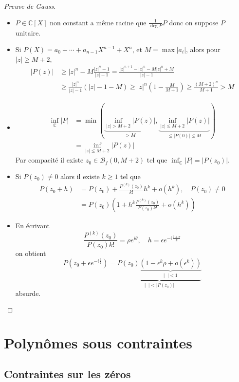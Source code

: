 \documentclass{article}
\theoremstyle{definition}
\begin{document}
\begin{proof}[Preuve de Gauss]
    \begin{itemize}
        \item $P\in \mathbb C[X]$ non constant a même racine que $\frac1{\deg P}P$ donc on suppose $P$ unitaire.
        \item Si $P(X)=a_0+\cdots+ a_{n-1}X^{n-1}+X^n$, et $M=\max |a_i|$, alors pour $|z|\geq M+2$, \begin{align*}
                |P(z)|&\geq |z|^n-M\frac{|z|^n-1}{|z|-1}=\frac{|z|^{n+1}-|z|^n-M|z|^n+M}{|z|-1}\\
                      &\geq \frac{|z|^n}{|z|-1} \left( |z|-1-M \right)\geq |z|^n\left(1-\frac M{M+1}\right)\geq \frac{(M+2)^n}{M+1}>M
            \end{align*}
        \item \begin{align*}
                \inf_{\mathbb C}|P|&=\min\left(\underbrace{\inf_{|z|>M+2}|P(z)|}_{>M}, \underbrace{\inf_{|z|\leq M+2}|P(z)|}_{\leq |P(0)|\leq M}\right) \\&=\inf _{|z|\leq M+2}|P(z)|
            \end{align*}
            Par compacité il existe $z_0\in\mathcal B_f(0, M+2)$ tel que $\inf_{\mathbb C}|P|=|P(z_0)|$.
        \item Si $P(z_0)\neq 0$ alors il existe $k\geq 1$ tel que \begin{align*}
                P(z_0+h)&=P(z_0)+\frac{P^{(k)}(z_0)}{k!}h^k+o(h^k), \quad P(z_0)\neq 0 \\
                        &=P(z_0)\left(1+h^k\frac{P^{(k)}(z_0)}{P(z_0)k!}+o(h^k) \right)
            \end{align*}
        \item En écrivant \[
                \frac{P^{(k)}(z_0)}{P(z_0)k!}=\rho e^{i\theta}, \quad h=\epsilon e^{-i\frac{\theta+\pi}k}
            \]
            on obtient \[
                P(z_0+\epsilon e^{-i\frac\theta k})=\underbrace{P(z_0)\underbrace{\left(1 - \epsilon^k \rho + o(\epsilon^k)\right)}_{|\;\;|<1}}_{|\;\;|<|P(z_0)|}
            \]
            absurde.
    \end{itemize}
\end{proof}

\section{Polynômes sous contraintes}

\subsection{Contraintes sur les zéros}
\end{document}
